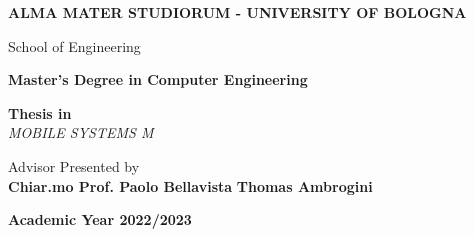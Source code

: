 \begin{titlepage}

    \begin{center}
        \large{\textbf{ALMA MATER STUDIORUM - UNIVERSITY OF BOLOGNA}}
    \end{center}

    \vspace{0.25cm}

    \begin{center}
        \large {School of Engineering}
    \end{center}

    \vspace{0.25cm}

    \begin{center}
        \large {\textbf{Master's Degree in Computer Engineering}}
    \end{center}

    \vspace{2cm}

    \begin{center}
        \textit{\mytitle}
    \end{center}

    \vspace{0.5cm}

    \begin{center}
        \large {\textbf{Thesis in}}\\
        \vspace{0.2cm}
        \textit{MOBILE SYSTEMS M}
    \end{center}

    \vspace{2cm}

    \noindent
    \large{{Advisor}} \hfill \large{{Presented by}}\\
    \large{\textbf{Chiar.mo Prof. Paolo Bellavista}} \hfill \large{\textbf{Thomas Ambrogini}}

    \vspace{2cm}

    \begin{center}
        \large {\textbf{Academic Year 2022/2023}}
    \end{center}

\end{titlepage}
